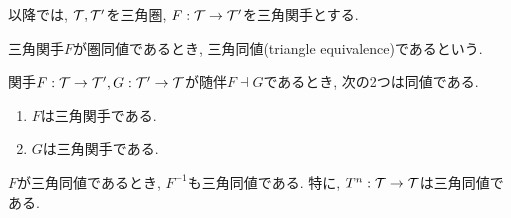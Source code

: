 \documentclass[uplatex, a4paper, 14Q, dvipdfmx]{jsarticle}
\begin{document}
以降では, $\mathcal{T}, \mathcal{T}'$を三角圏, $F: \mathcal{T} \to \mathcal{T}'$を三角関手とする.

\begin{definition}[三角同値] 
  三角関手$F$が圏同値であるとき, 三角同値(triangle equivalence)であるという. 
\end{definition}

\begin{theorem} \label{adjoint_triangulated}
  関手$F: \mathcal{T} \to \mathcal{T}', G: \mathcal{T}' \to \mathcal{T}$が随伴$F \dashv G$であるとき, 次の2つは同値である.  
  \begin{enumerate}
    \item $F$は三角関手である. 
    \item $G$は三角関手である. 
  \end{enumerate}
\end{theorem}

\begin{corollary}
  $F$が三角同値であるとき, $F^{-1}$も三角同値である. 
  特に, $T^n: \mathcal{T} \to \mathcal{T}$は三角同値である. 
\end{corollary}



\end{document}

